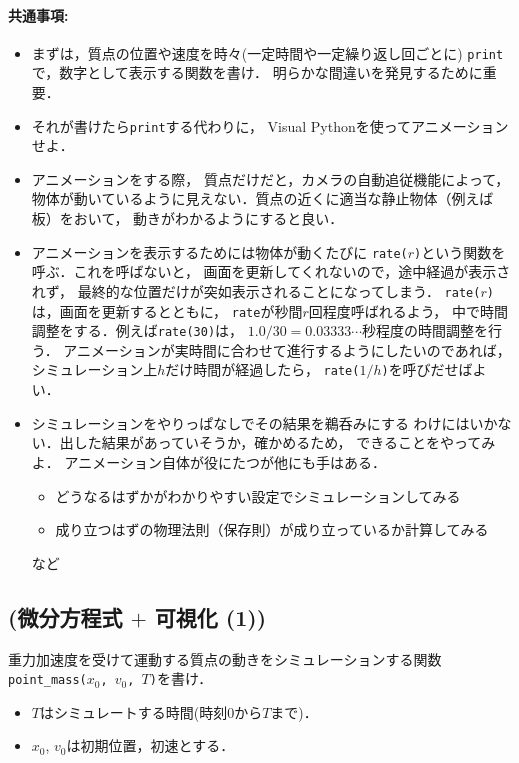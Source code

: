 \documentclass[10pt,dvipdfmx]{article}
\begin{document}
\paragraph{共通事項:}
\begin{itemize}
\item 
まずは，質点の位置や速度を時々(一定時間や一定繰り返し回ごとに)
{\tt print}で，数字として表示する関数を書け．
明らかな間違いを発見するために重要．

\item それが書けたら{\tt print}する代わりに，
Visual Pythonを使ってアニメーションせよ．

\item アニメーションをする際，
質点だけだと，カメラの自動追従機能によって，
物体が動いているように見えない．質点の近くに適当な静止物体（例えば板）をおいて，
動きがわかるようにすると良い．

\item アニメーションを表示するためには物体が動くたびに
{\tt rate($r$)}という関数を呼ぶ．これを呼ばないと，
画面を更新してくれないので，途中経過が表示されず，
最終的な位置だけが突如表示されることになってしまう．
{\tt rate($r$)}は，画面を更新するとともに，
{\tt rate}が秒間$r$回程度呼ばれるよう，
中で時間調整をする．例えば{\tt rate(30)}は，
$1.0 / 30 = 0.03333\cdots$秒程度の時間調整を行う．
アニメーションが実時間に合わせて進行するようにしたいのであれば，
シミュレーション上$h$だけ時間が経過したら，
{\tt rate($1/h$)}を呼びだせばよい．

\item シミュレーションをやりっぱなしでその結果を鵜呑みにする
わけにはいかない．出した結果があっていそうか，確かめるため，
できることをやってみよ．
アニメーション自体が役にたつが他にも手はある．
\begin{itemize}
\item どうなるはずかがわかりやすい設定でシミュレーションしてみる
\item 成り立つはずの物理法則（保存則）が成り立っているか計算してみる
\end{itemize}
など
\end{itemize}

\subsection{{\scriptsize (微分方程式 $+$ 可視化 (1))}}
重力加速度を受けて運動する質点の動きをシミュレーションする関数
{\tt point\_mass($x_0$, $v_0$, $T$)}を書け．
\begin{itemize}
\item $T$はシミュレートする時間(時刻0から$T$まで)．
\item $x_0$, $v_0$は初期位置，初速とする．
\end{itemize}
\end{document}
